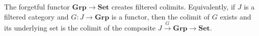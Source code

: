  The forgetful functor $\mathbf{Grp} \to \mathbf{Set}$ creates filtered colimits. Equivalently, if $J$ is a filtered category and $G : J \to \mathbf{Grp}$ is a functor, then the colimit of $G$ exists and its underlying set is the colimit of the composite $J \xrightarrow{G} \mathbf{Grp} \to \mathbf{Set}$.
